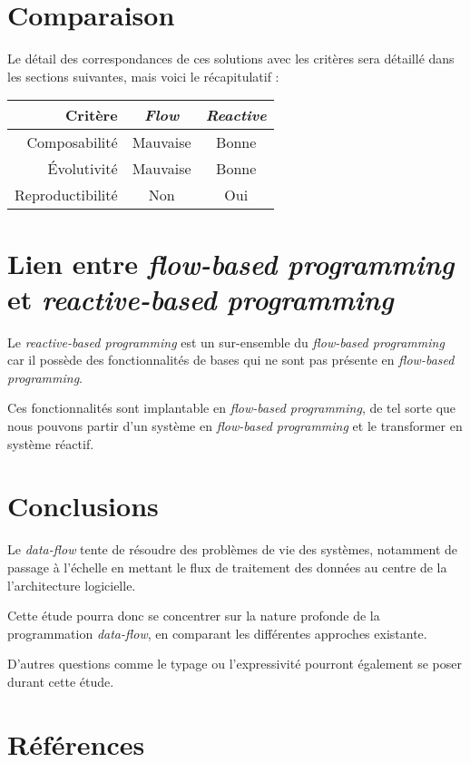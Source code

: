 \documentclass{article}
\begin{document}
\section{Comparaison}
Le détail des correspondances de ces solutions avec les critères sera détaillé
dans les sections suivantes, mais voici le récapitulatif :

\begin{center}
\begin{tabular}{r|c c}
Critère & \emph{Flow} & \emph{Reactive} \\
\hline
Composabilité & Mauvaise & Bonne \\
Évolutivité & Mauvaise & Bonne \\
Reproductibilité & Non & Oui \\
\end{tabular}
\end{center}

\section{Lien entre \emph{flow-based programming} et \emph{reactive-based programming}}
Le \emph{reactive-based programming} est un sur-ensemble du \emph{flow-based programming}
car il possède des fonctionnalités de bases qui ne sont pas présente en \emph{flow-based programming}.

Ces fonctionnalités sont implantable en \emph{flow-based programming}, de tel sorte
que nous pouvons partir d'un système en \emph{flow-based programming} et le transformer
en système réactif.

\section{Conclusions}\label{conclusions}

Le \emph{data-flow} tente de résoudre des problèmes de vie des systèmes,
notamment de passage à l'échelle en mettant le flux de traitement des données
au centre de la l'architecture logicielle.

Cette étude pourra donc se concentrer sur la nature profonde de la
programmation \emph{data-flow}, en comparant les différentes approches
existante.

D'autres questions comme le typage ou l'expressivité pourront également
se poser durant cette étude.


\section{Références}\label{références}


\end{document}
